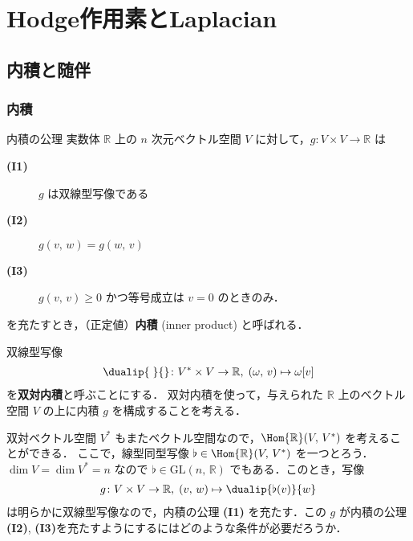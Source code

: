 \documentclass[geometry_main]{subfiles}
\begin{document}
\setcounter{chapter}{4}

\chapter{Hodge作用素とLaplacian}

\section{内積と随伴}
\subsection{内積}

\begin{myaxiom}[label=ax.inner]{内積の公理} 
	実数体 $\mathbb{R}$ 上の $n$ 次元ベクトル空間 $V$ に対して，$g \colon V \times V \to \mathbb{R}$ は
	\begin{description} 
		\item[\textbf{(I1)}] $g$ は双線型写像である
		\item[\textbf{(I2)}] $g(v,\, w) = g(w,\, v)$
		\item[\textbf{(I3)}] $g(v,\, v) \ge 0$ かつ等号成立は $v = 0$ のときのみ．
	\end{description}
	を充たすとき，（正定値）\textbf{内積} (inner product) と呼ばれる．
\end{myaxiom}

双線型写像
\begin{align}
	\dualip{\;}{} \colon V^* \times V \to \mathbb{R},\; (\omega,\, v) \mapsto \omega[v]
\end{align}
を\textbf{双対内積}と呼ぶことにする．
双対内積を使って，与えられた $\mathbb{R}$ 上のベクトル空間 $V$ の上に内積 $g$ を構成することを考える．

双対ベクトル空間 $V^*$ もまたベクトル空間なので，$\Hom{\mathbb{R}} (V,\, V^*)$ を考えることができる．
ここで，線型同型写像 $\flat \in \Hom{\mathbb{R}} (V,\, V^*)$ を一つとろう．$\dim V = \dim V^* = n$ なので $\flat \in \mathrm{GL}(n,\, \mathbb{R})$ でもある．このとき，写像
\begin{align} 
	\label{eq.g_V}
	g \colon V \times V \to \mathbb{R},\; (v,\, w) \mapsto \dualip{\flat(v)}{w}
\end{align}
は明らかに双線型写像なので，内積の公理 \textbf{(I1)} を充たす．この $g$ が内積の公理\textbf{(I2)}, \textbf{(I3)}を充たすようにするにはどのような条件が必要だろうか．
\end{document}
